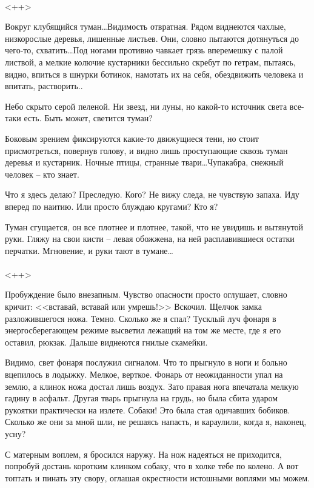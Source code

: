 \documentclass[a4paper]{book}
\begin{document}
\paragraph{}<++>


Вокруг клубящийся туман\ldots Видимость отвратная. Рядом виднеются чахлые, низкорослые деревья, лишенные листьев. Они, словно пытаются дотянуться до чего-то, схватить\ldots Под ногами противно чавкает грязь вперемешку с палой листвой, а мелкие колючие кустарники бессильно скребут по гетрам, пытаясь, видно, впиться в шнурки ботинок, намотать их на себя, обездвижить человека и впитать, растворить.. 

Небо скрыто серой пеленой. Ни звезд, ни луны, но какой-то источник света все-таки есть. Быть может, светится туман? 

Боковым зрением фиксируются какие-то движущиеся тени, но стоит присмотреться, повернув голову, и видно лишь проступающие сквозь туман деревья и кустарник. Ночные птицы, странные твари\ldots Чупакабра, снежный человек -- кто знает. 

Что я здесь делаю? Преследую. Кого? Не вижу следа, не чувствую запаха. Иду вперед по наитию. Или просто блуждаю кругами? Кто я? 

Туман сгущается, он все плотнее и плотнее, такой, что не увидишь и вытянутой руки. Гляжу на свои кисти -- левая обожжена, на ней расплавившиеся остатки перчатки. Мгновение, и руки тают в тумане\ldots
\\
\paragraph{}<++>


Пробуждение было внезапным. Чувство опасности просто оглушает, словно кричит: <<вставай, вставай или умрешь!>> Вскочил. Щелчок замка разложившегося ножа. Темно. Сколько же я спал? Тусклый луч фонаря в энергосберегающем режиме высветил лежащий на том же месте, где я его оставил, рюкзак. Дальше виднеются гнилые скамейки. 

Видимо, свет фонаря послужил сигналом. Что то прыгнуло в ноги и больно вцепилось в лодыжку. Мелкое, верткое. Фонарь от неожиданности упал на землю, а клинок ножа достал лишь воздух. Зато правая нога впечатала мелкую гадину в асфальт. Другая тварь прыгнула на грудь, но была сбита ударом рукоятки практически на излете. Собаки! Это была стая одичавших бобиков. Сколько же они за мной шли, не решаясь напасть, и караулили, когда я, наконец, усну?

С матерным воплем, я бросился наружу. На нож надеяться не приходится, попробуй достань коротким клинком собаку, что в холке тебе по колено. А вот топтать и пинать эту свору, оглашая окрестности истошными воплями мы можем. 
\end{document}
